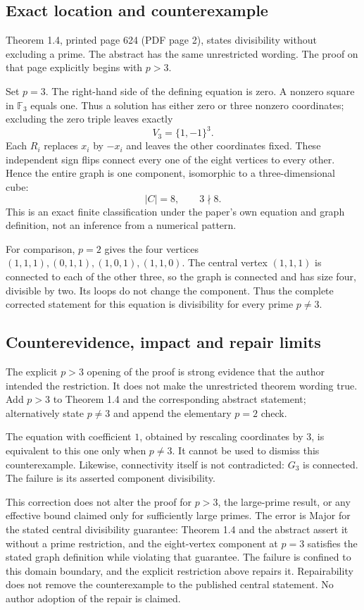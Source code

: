 \documentclass[10pt]{article}
\begin{document}
\subsection*{Exact location and counterexample}
Theorem 1.4, printed page 624 (PDF page 2), states divisibility without excluding a prime. The abstract has the same unrestricted wording. The proof on that page explicitly begins with \(p>3\).\par
Set \(p=3\). The right-hand side of the defining equation is zero. A nonzero square in \(\mathbb F_3\) equals one. Thus a solution has either zero or three nonzero coordinates; excluding the zero triple leaves exactly \[V_3=\{1,-1\}^3.\] Each \(R_i\) replaces \(x_i\) by \(-x_i\) and leaves the other coordinates fixed. These independent sign flips connect every one of the eight vertices to every other. Hence the entire graph is one component, isomorphic to a three-dimensional cube: \[|C|=8,\qquad 3\nmid8.\] This is an exact finite classification under the paper’s own equation and graph definition, not an inference from a numerical pattern.\par
For comparison, \(p=2\) gives the four vertices \((1,1,1),(0,1,1),(1,0,1),(1,1,0)\). The central vertex \((1,1,1)\) is connected to each of the other three, so the graph is connected and has size four, divisible by two. Its loops do not change the component. Thus the complete corrected statement for this equation is divisibility for every prime \(p\ne3\).\par
\subsection*{Counterevidence, impact and repair limits}
The explicit \(p>3\) opening of the proof is strong evidence that the author intended the restriction. It does not make the unrestricted theorem wording true. Add \(p>3\) to Theorem 1.4 and the corresponding abstract statement; alternatively state \(p\ne3\) and append the elementary \(p=2\) check.\par
The equation with coefficient \(1\), obtained by rescaling coordinates by \(3\), is equivalent to this one only when \(p\ne3\). It cannot be used to dismiss this counterexample. Likewise, connectivity itself is not contradicted: \(G_3\) is connected. The failure is its asserted component divisibility.\par
This correction does not alter the proof for \(p>3\), the large-prime result, or any effective bound claimed only for sufficiently large primes. The error is Major for the stated central divisibility guarantee: Theorem 1.4 and the abstract assert it without a prime restriction, and the eight-vertex component at \(p=3\) satisfies the stated graph definition while violating that guarantee. The failure is confined to this domain boundary, and the explicit restriction above repairs it. Repairability does not remove the counterexample to the published central statement. No author adoption of the repair is claimed.\par
\end{document}
